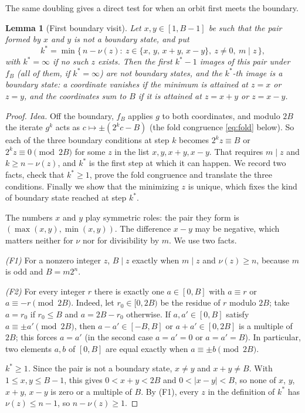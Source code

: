 \documentclass[11pt]{amsart}
\newtheorem{lemma}[theorem]{Lemma}
\theoremstyle{definition}
\theoremstyle{remark}
\newcommand{\vt}{\nu}
\begin{document}
The same doubling gives a direct test for when an orbit first meets the boundary.

\begin{lemma}[First boundary visit]\label{lem:visit}
Let $x,y\in[1,B-1]$ be such that the pair formed by $x$ and $y$ is not a boundary state, and put
\[
k^*=\min\{\,n-\vt(z):\ z\in\{x,\,y,\,x+y,\,x-y\},\ z\ne0,\ m\mid z\,\},
\]
with $k^*=\infty$ if no such $z$ exists. Then the first $k^*-1$ images of this pair under $f_B$ (all of them, if $k^*=\infty$) are not boundary states, and the $k^*$-th image is a boundary state: a coordinate vanishes if the minimum is attained at $z=x$ or $z=y$, and the coordinates sum to $B$ if it is attained at $z=x+y$ or $z=x-y$.
\end{lemma}

\begin{proof}
\emph{Idea.} Off the boundary, $f_B$ applies $g$ to both coordinates, and modulo $2B$ the iterate $g^k$ acts as $c\mapsto\pm(2^kc-B)$ (the fold congruence \eqref{eq:fold} below). So each of the three boundary conditions at step $k$ becomes $2^kz\equiv B$ or $2^kz\equiv0\pmod{2B}$ for some $z$ in the list $x,y,x+y,x-y$. That requires $m\mid z$ and $k\ge n-\vt(z)$, and $k^*$ is the first step at which it can happen. We record two facts, check that $k^*\ge1$, prove the fold congruence and translate the three conditions. Finally we show that the minimizing $z$ is unique, which fixes the kind of boundary state reached at step $k^*$.

The numbers $x$ and $y$ play symmetric roles: the pair they form is $(\max(x,y),\min(x,y))$. The difference $x-y$ may be negative, which matters neither for $\vt$ nor for divisibility by $m$. We use two facts.

\emph{(F1)} For a nonzero integer $z$, $B\mid z$ exactly when $m\mid z$ and $\vt(z)\ge n$, because $m$ is odd and $B=m2^n$.

\emph{(F2)} For every integer $r$ there is exactly one $a\in[0,B]$ with $a\equiv r$ or $a\equiv-r\pmod{2B}$. Indeed, let $r_0\in[0,2B)$ be the residue of $r$ modulo $2B$; take $a=r_0$ if $r_0\le B$ and $a=2B-r_0$ otherwise. If $a,a'\in[0,B]$ satisfy $a\equiv\pm a'\pmod{2B}$, then $a-a'\in[-B,B]$ or $a+a'\in[0,2B]$ is a multiple of $2B$; this forces $a=a'$ (in the second case $a=a'=0$ or $a=a'=B$). In particular, two elements $a,b$ of $[0,B]$ are equal exactly when $a\equiv\pm b\pmod{2B}$.

\emph{$k^*\ge1$.} Since the pair is not a boundary state, $x\ne y$ and $x+y\ne B$. With $1\le x,y\le B-1$, this gives $0<x+y<2B$ and $0<|x-y|<B$, so none of $x$, $y$, $x+y$, $x-y$ is zero or a multiple of $B$. By (F1), every $z$ in the definition of $k^*$ has $\vt(z)\le n-1$, so $n-\vt(z)\ge1$.


\end{proof}
\end{document}
